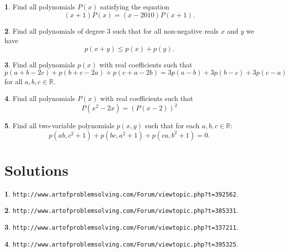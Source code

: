 \documentclass{article}
\theoremstyle{definition}
\newtheorem{p}{}
\newtheorem{s}{}
\begin{document}
\begin{p}
Find all polynomials $ P(x)$ satisfying the equation
\[(x+1)P(x)=(x-2010)P(x+1).\]
\end{p}




\begin{p}
Find all polynomials of degree $3$ such that for all non-negative reals $x$ and $y$ we have
\[p(x+y) \leq p(x)+p(y).\]
\end{p}



\begin{p}
Find all polynomials $p(x)$ with real coefficients such that
\[p(a + b - 2c) + p(b + c - 2a) + p(c + a - 2b) = 3p(a - b) + 3p(b - c) + 3p(c - a)\]
for all $a, b, c\in\mathbb{R}$.
\end{p}



\begin{p}
Find all  polynomials $P(x)$ with real coefficients such that
\[P(x^2-2x)=\left(P(x-2)\right)^2\]
\end{p}



\begin{p}
Find all two-variable polynomials $p(x,y)$ such that for each $a,b,c\in\mathbb R$:
\[p(ab,c^2+1)+p(bc,a^2+1)+p(ca,b^2+1)=0.\]
\end{p}

\newpage

\section*{Solutions}

\begin{s}
\texttt{http://www.artofproblemsolving.com/Forum/viewtopic.php?t=392562}.
\end{s}

\begin{s}
\texttt{http://www.artofproblemsolving.com/Forum/viewtopic.php?t=385331}.
\end{s}


\begin{s}
\texttt{http://www.artofproblemsolving.com/Forum/viewtopic.php?t=337211}.
\end{s}




\begin{s}
\texttt{http://www.artofproblemsolving.com/Forum/viewtopic.php?t=395325}.
\end{s}
\end{document}
